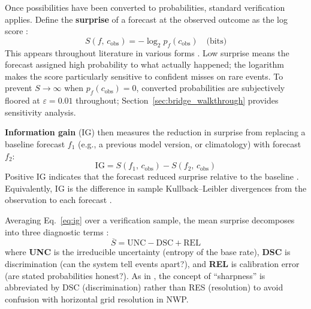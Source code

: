 Once possibilities have been converted to
probabilities, standard verification applies.
Define the \textbf{surprise} of a forecast at
the observed outcome as the log
score \citep{Shannon1948-nc}:
\begin{equation}
S(f,\, c_{\mathrm{obs}})
    = -\log_2 p_f(c_{\mathrm{obs}}) \quad \text{(bits)}
\label{eq:surprise}
\end{equation}
This appears throughout literature in
various forms
\citep{Good1952-st,Roulston2002-eq,Benedetti2010-sa,Weijs2010-hg, Peirolo2011-sl,Cover2012-di,Todter2012-ou}.
Low surprise means the forecast assigned high
probability to what actually happened;
the logarithm makes the score particularly
sensitive to confident misses on rare events.
To prevent $S \to \infty$ when
$p_f(c_{\mathrm{obs}}) = 0$,
converted probabilities are subjectively floored
at $\varepsilon = 0.01$ throughout;
Section~\ref{sec:bridge_walkthrough} provides
sensitivity analysis.

\textbf{Information gain} (IG) then measures the reduction in surprise
from replacing a baseline forecast $f_1$
(e.g., a previous model version,
or climatology) with forecast $f_2$:
\begin{equation}
\mathrm{IG}
    = S(f_1,\, c_{\mathrm{obs}})
    - S(f_2,\, c_{\mathrm{obs}})
\label{eq:ig}
\end{equation}
Positive IG indicates that the forecast reduced surprise relative to
the baseline \citep{Roulston2002-eq}. Equivalently, IG is the
difference in sample Kullback--Leibler divergences
from the observation to each
forecast \citet{Weijs2011-cf}.

Averaging Eq.~\eqref{eq:ig} over a verification
sample, the mean surprise decomposes into three
diagnostic terms \citep{Hersbach2000-yb}:
\begin{equation}
\overline{S}
    = \mathrm{UNC} - \mathrm{DSC} + \mathrm{REL}
\label{eq:ig_decomp}
\end{equation}
where \textbf{UNC} is the irreducible uncertainty (entropy of the base
rate), \textbf{DSC} is discrimination (can the system tell events
apart?), and \textbf{REL} is calibration error (are
stated probabilities honest?).
As in \citet{Lawson2024-bu},
the concept of ``sharpness'' is abbreviated by DSC
(discrimination) rather than RES (resolution) to avoid
confusion with horizontal grid resolution in
NWP.



